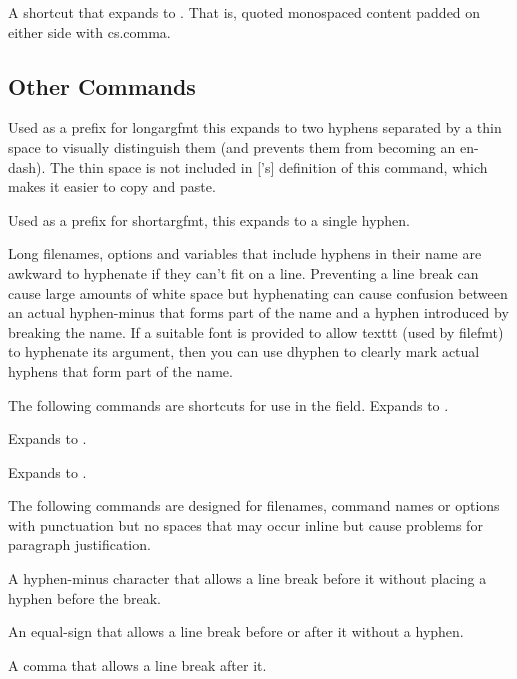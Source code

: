 \documentclass[toc=listof]{scrreport}
\begin{document}
A shortcut that expands to
.
That is, quoted monospaced content padded on either side with
\gls{cs.comma}.

\subsection{Other Commands}
\label{sec:othercmds}

Used as a prefix for \gls{longargfmt} this expands to two hyphens
separated by a thin space to visually distinguish them (and prevents
them from becoming an en-dash).
The thin space is not included in ['s] definition
of this command, which makes it easier to copy and paste.

Used as a prefix for \gls{shortargfmt}, this expands to a single hyphen.

Long filenames, options and variables that include hyphens in their name are
awkward to hyphenate if they can't fit on a line. Preventing a line
break can cause large amounts of white space but hyphenating can
cause confusion between an actual \gls{hyphen-minus} that
forms part of the name and a hyphen introduced by breaking the name. If a suitable font is
provided to allow \gls{texttt} (used by \gls{filefmt}) to hyphenate
its argument, then you can use \gls{dhyphen} to clearly mark
actual hyphens that form part of the name.

The following commands are shortcuts for use in the 
field.
Expands to .

Expands to
.

Expands to .

The following commands are designed for filenames, command names or
options with punctuation but no spaces that may occur inline but
cause problems for paragraph justification.

A \gls{hyphen-minus} character that allows a line break before it without placing a
hyphen before the break.

An \gls{equal-sign} that allows a line break before or after it without a
hyphen.

A \gls{comma} that allows a line break after it.
\end{document}

